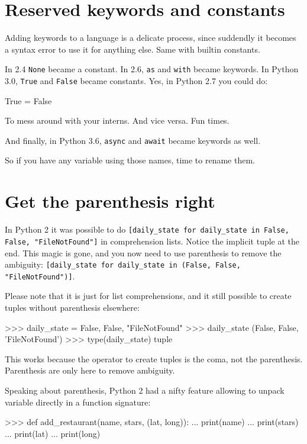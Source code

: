 \begin{py2}
\begin{py2}
\begin{py2and3}
\begin{py2and3}
\section{Reserved keywords and constants}

Adding \glspl{keyword} to a language is a delicate process, since suddendly it becomes a syntax error to use it for anything else. Same with \gls{builtin} constants.

In 2.4 \lstinline{None} became a constant. In 2.6, \lstinline{as} and \lstinline{with} became keywords. In Python 3.0, \lstinline{True} and \lstinline{False} became constants. Yes, in Python 2.7 you could do:

\begin{py2}
True = False
\end{py2}

To mess around with your interns. And vice versa. Fun times.

And finally, in Python 3.6, \lstinline{async} and \lstinline{await} became keywords as well.

So if you have any variable using those names, time to rename them.

\section{Get the parenthesis right}

In Python 2 it was possible to do \lstinline{[daily_state for daily_state in False, False, "FileNotFound"]} in comprehension lists. Notice the implicit tuple at the end. This magic is gone, and you now need to use parenthesis to remove the ambiguity: \lstinline{[daily_state for daily_state in (False, False, "FileNotFound")]}.

Please note that it is just for list comprehensions, and it still possible to create tuples without parenthesis elsewhere:

\begin{py2and3}
>>> daily_state = False, False, "FileNotFound"
>>> daily_state
(False, False, 'FileNotFound')
>>> type(daily_state)
tuple
\end{py2and3}

This works because the operator to create tuples is the coma, not the parenthesis. Parenthesis are only here to remove ambiguity.

Speaking about parenthesis, Python 2 had a nifty feature allowing to unpack variable directly in a function signature:

\begin{py2}
>>> def add_restaurant(name, stars, (lat, long)):
...    print(name)
...    print(stars)
...    print(lat)
...    print(long)
\end{py2}


\end{py2and3}
\end{py2and3}
\end{py2}
\end{py2}
